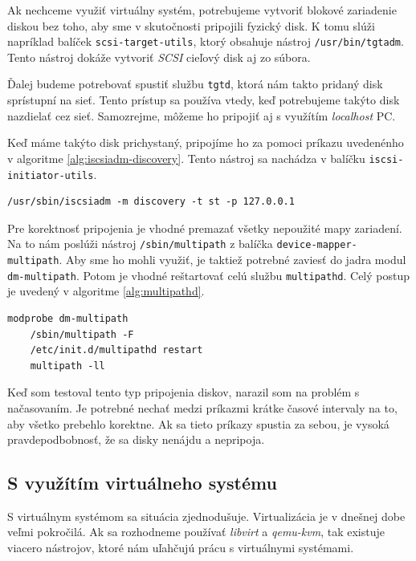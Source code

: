 Ak nechceme využiť virtuálny systém, potrebujeme vytvoriť blokové zariadenie
diskou bez toho, aby sme v skutočnosti pripojili fyzický disk. K tomu slúži
napríklad balíček \texttt{scsi-target-utils}, ktorý obsahuje nástroj
\texttt{/usr/bin/tgtadm}.  Tento nástroj dokáže vytvoriť \emph{SCSI} cieľový
disk aj zo súbora. 

Ďalej budeme potrebovať spustiť službu \texttt{tgtd}, ktorá nám takto pridaný
disk sprístupní na sieť. Tento prístup sa používa vtedy, keď potrebujeme takýto
disk nazdielať cez sieť. Samozrejme, môžeme ho pripojiť aj s využítím
\emph{localhost} PC.

Keď máme takýto disk prichystaný, pripojíme ho za pomoci príkazu uvedenénho v
algoritme \ref{alg:iscsiadm-discovery}. Tento nástroj sa nachádza v balíčku
\texttt{iscsi-initiator-utils}.
\\
\begin{lstlisting}[caption=Vyhľadávanie diskov na sieti pomocou iscsiadm,label=alg:iscsiadm-discovery]
    /usr/sbin/iscsiadm -m discovery -t st -p 127.0.0.1
\end{lstlisting}

Pre korektnosť pripojenia je vhodné premazať všetky nepoužité mapy zariadení.
Na to nám poslúži nástroj \texttt{/sbin/multipath} z balíčka
\texttt{device-mapper-multipath}. Aby sme ho mohli využiť, je taktiež potrebné
zaviesť do jadra modul \texttt{dm-multipath}. Potom je vhodné reštartovať celú
službu \texttt{multipathd}. Celý postup je uvedený v algoritme
\ref{alg:multipathd}.
\\
\begin{lstlisting}[label=alg:multipathd,caption=Vyhľadanie zariadení pomocou multipathd]
    modprobe dm-multipath
    /sbin/multipath -F
    /etc/init.d/multipathd restart
    multipath -ll
\end{lstlisting}

Keď som testoval tento typ pripojenia diskov, narazil som na problém s
načasovaním. Je potrebné nechať medzi príkazmi krátke časové intervaly na to,
aby všetko prebehlo korektne. Ak sa tieto príkazy spustia za sebou, je vysoká
pravdepodbobnosť, že sa disky nenájdu a nepripoja.

%
%

\subsection{S využítím virtuálneho systému}

S virtuálnym systémom sa situácia zjednodušuje. Virtualizácia je v dnešnej dobe
veľmi pokročilá. Ak sa rozhodneme používať \emph{libvirt} a \emph{qemu-kvm},
tak existuje viacero nástrojov, ktoré nám uľahčujú prácu s virtuálnymi
systémami.

